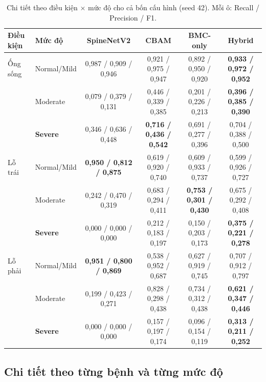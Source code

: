 \documentclass[11pt,a4paper]{article}
\begin{document}
\begin{table}[htbp]\centering\scriptsize
\caption{Chi tiết theo điều kiện $\times$ mức độ cho cả bốn cấu hình (seed 42). Mỗi ô: Recall / Precision / F1.}
\label{tab:phase2full}
\setlength{\tabcolsep}{3.5pt}
\begin{tabular}{llcccc}\toprule
\textbf{Điều kiện} & \textbf{Mức độ} & \textbf{SpineNetV2} & \textbf{CBAM} & \textbf{BMC-only} & \textbf{Hybrid} \\\midrule
Ống sống & Normal/Mild & 0{,}987 / 0{,}909 / 0{,}946 & 0{,}921 / 0{,}975 / 0{,}947 & 0{,}892 / 0{,}950 / 0{,}920 & \textbf{0{,}933 / 0{,}972 / 0{,}952} \\
 & Moderate & 0{,}079 / 0{,}379 / 0{,}131 & 0{,}446 / 0{,}339 / 0{,}385 & 0{,}201 / 0{,}226 / 0{,}213 & \textbf{0{,}396 / 0{,}385 / 0{,}390} \\
 & \textbf{Severe} & 0{,}346 / 0{,}636 / 0{,}448 & \textbf{0{,}716 / 0{,}436 / 0{,}542} & 0{,}691 / 0{,}277 / 0{,}396 & 0{,}704 / 0{,}388 / 0{,}500 \\
\midrule
Lỗ trái & Normal/Mild & \textbf{0{,}950 / 0{,}812 / 0{,}875} & 0{,}619 / 0{,}920 / 0{,}740 & 0{,}609 / 0{,}933 / 0{,}737 & 0{,}599 / 0{,}926 / 0{,}727 \\
 & Moderate & 0{,}242 / 0{,}470 / 0{,}319 & 0{,}683 / 0{,}294 / 0{,}411 & \textbf{0{,}753 / 0{,}301 / 0{,}430} & 0{,}675 / 0{,}292 / 0{,}408 \\
 & \textbf{Severe} & 0{,}000 / 0{,}000 / 0{,}000 & 0{,}212 / 0{,}183 / 0{,}197 & 0{,}150 / 0{,}203 / 0{,}173 & \textbf{0{,}375 / 0{,}221 / 0{,}278} \\
\midrule
Lỗ phải & Normal/Mild & \textbf{0{,}951 / 0{,}800 / 0{,}869} & 0{,}538 / 0{,}952 / 0{,}687 & 0{,}627 / 0{,}919 / 0{,}745 & 0{,}707 / 0{,}912 / 0{,}797 \\
 & Moderate & 0{,}199 / 0{,}423 / 0{,}271 & 0{,}828 / 0{,}298 / 0{,}438 & 0{,}734 / 0{,}312 / 0{,}438 & \textbf{0{,}621 / 0{,}347 / 0{,}446} \\
 & \textbf{Severe} & 0{,}000 / 0{,}000 / 0{,}000 & 0{,}157 / 0{,}197 / 0{,}174 & 0{,}096 / 0{,}154 / 0{,}119 & \textbf{0{,}313 / 0{,}211 / 0{,}252} \\
\bottomrule\end{tabular}\end{table}

\subsection{Chi tiết theo từng bệnh và từng mức độ}
\end{document}
